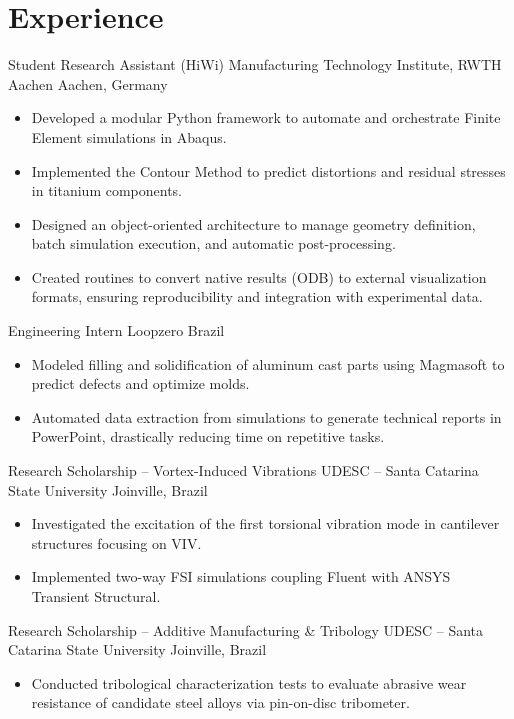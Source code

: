 
\section{Experience}

  {Student Research Assistant (HiWi)}
  {Manufacturing Technology Institute, RWTH Aachen}
  {Aachen, Germany}
  {}
  {
    \begin{itemize}
      \item Developed a modular Python framework to automate and orchestrate Finite Element simulations in Abaqus.
      \item Implemented the Contour Method to predict distortions and residual stresses in titanium components.
      \item Designed an object-oriented architecture to manage geometry definition, batch simulation execution, and automatic post-processing.
      \item Created routines to convert native results (ODB) to external visualization formats, ensuring reproducibility and integration with experimental data.
    \end{itemize}
  }

  {Engineering Intern}
  {Loopzero}
  {Brazil}
  {}
  {
    \begin{itemize}
      \item Modeled filling and solidification of aluminum cast parts using Magmasoft to predict defects and optimize molds.
      \item Automated data extraction from simulations to generate technical reports in PowerPoint, drastically reducing time on repetitive tasks.
    \end{itemize}
  }

  {Research Scholarship -- Vortex-Induced Vibrations}
  {UDESC -- Santa Catarina State University}
  {Joinville, Brazil}
  {}
  {
    \begin{itemize}
      \item Investigated the excitation of the first torsional vibration mode in cantilever structures focusing on VIV.
      \item Implemented two-way FSI simulations coupling Fluent with ANSYS Transient Structural.
    \end{itemize}
  }

  {Research Scholarship -- Additive Manufacturing \& Tribology}
  {UDESC -- Santa Catarina State University}
  {Joinville, Brazil}
  {}
  {
    \begin{itemize}
      \item Conducted tribological characterization tests to evaluate abrasive wear resistance of candidate steel alloys via pin-on-disc tribometer.
    \end{itemize}
  }

